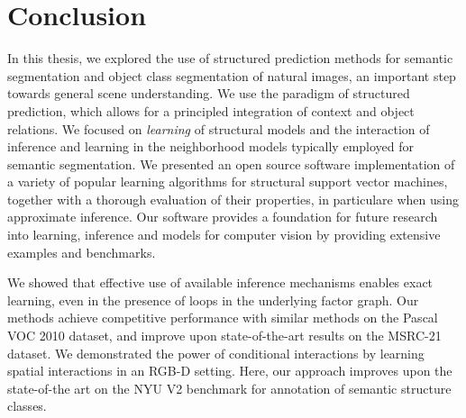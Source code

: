 \documentclass[12pt,toc=bibnumbered, a4paper,twoside,DIV=11,BCOR=1cm]{scrbook}
\begin{document}
\chapter{Conclusion}
In this thesis, we explored the use of structured prediction methods for semantic
segmentation and object class segmentation of natural images, an important
step towards general scene understanding.
We use the paradigm of structured prediction, which allows for a principled
integration of context and object relations.
We focused on \emph{learning} of structural models and the interaction of
inference and learning in the neighborhood models typically employed for
semantic segmentation.
We presented an open source software implementation of a variety of
popular learning algorithms for structural support vector machines, together
with a thorough evaluation of their properties, in particulare when using approximate
inference. Our software provides a foundation for future research into learning,
inference and models for computer vision by providing extensive examples and
benchmarks.

We showed that effective use of available inference mechanisms enables
exact learning, even in the presence of loops in the underlying
factor graph. Our methods achieve competitive performance with similar
 methods on the Pascal VOC 2010 dataset, and improve upon state-of-the-art
 results on the MSRC-21 dataset.
We demonstrated the power of conditional interactions by learning spatial
interactions in an RGB-D setting. Here, our approach improves upon the state-of-the
art on the NYU V2 benchmark for annotation of semantic structure classes.
\end{document}
